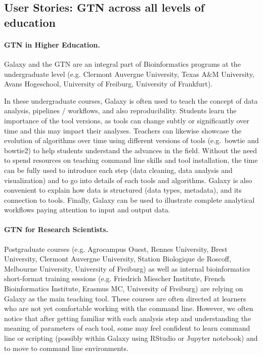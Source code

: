 \subsection*{User Stories: GTN across all levels of education}\label{sec:userstories}


\paragraph{GTN in Higher Education.}
Galaxy and the GTN are an integral part of Bioinformatics programs at the undergraduate level (e.g. Clermont Auvergne University, Texas A\&M University, Avans Hogeschool, University of Freiburg, University of Frankfurt). 

In these undergraduate courses, Galaxy is often used to teach the concept of data analysis, pipelines / workflows, and also reproducibility. Students learn the importance of the tool versions, as tools can change subtly or significantly over time and this may impact their analyses. Teachers can likewise showcase the evolution of algorithms over time using different versions of tools (e.g.\ bowtie and bowtie2) to help students understand the advances in the field. 
Without the need to spend resources on teaching command line skills and tool installation, the time can be fully used to introduce each step (data cleaning, data analysis and visualization) and to go into details of each tools and algorithms. Galaxy is also convenient to explain how data is structured (data types, metadata), and its connection to tools. Finally, Galaxy can be used to illustrate complete analytical workflows paying attention to input and output data.

\paragraph{GTN for Research Scientists.}
Postgraduate courses (e.g. Agrocampus Ouest, Rennes University, Brest University, Clermont Auvergne University, Station Biologique de Roscoff, Melbourne University, University of Freiburg) as well as internal bioinformatics short-format training sessions (e.g. Friedrich Miescher Institute, French Bioinformatics Institute, Erasmus MC, University of Freiburg) are relying on Galaxy as the main teaching tool.
These courses are often directed at learners who are not yet comfortable working with the command line. However, we often notice that after getting familiar with each analysis step and understanding the meaning of parameters of each tool, some may feel confident to learn command line or scripting (possibly within Galaxy using RStudio or Jupyter notebook) and  to move to command line environments. %

